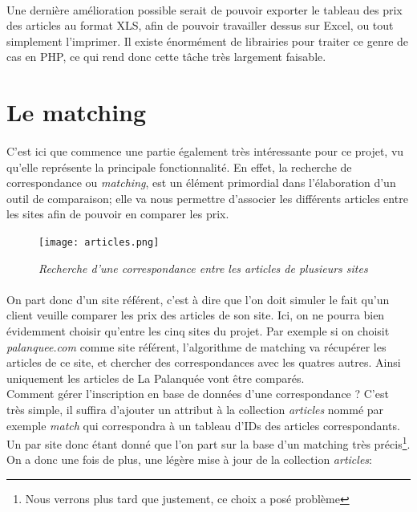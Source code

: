 \documentclass{report}
\begin{document}
\paragraph{}
Une dernière amélioration possible serait de pouvoir exporter le tableau des prix des articles au format XLS, afin de pouvoir travailler dessus sur Excel, ou tout simplement l'imprimer. Il existe énormément de librairies pour traiter ce genre de cas en PHP, ce qui rend donc cette tâche très largement faisable.

\section{Le matching}

\paragraph{}
C'est ici que commence une partie également très intéressante pour ce projet, vu qu'elle représente la principale fonctionnalité. En effet, la recherche de correspondance ou \textit{matching}, est un élément primordial dans l'élaboration d'un outil de comparaison; elle va nous permettre d'associer les différents articles entre les sites afin de pouvoir en comparer les prix.\\

\begin{figure}[H]
\begin{center}
\texttt{[image: articles.png]}
\caption{\textit{Recherche d'une correspondance entre les articles de plusieurs sites}}
\end{center}
\end{figure}

\paragraph{}
On part donc d'un site référent, c'est à dire que l'on doit simuler le fait qu'un client veuille comparer les prix des articles de son site. Ici, on ne pourra bien évidemment choisir qu'entre les cinq sites du projet. Par exemple si on choisit \textit{palanquee.com} comme site référent, l'algorithme de matching va récupérer les articles de ce site, et chercher des correspondances avec les quatres autres. Ainsi uniquement les articles de La Palanquée vont être comparés.\\
Comment gérer l'inscription en base de données d'une correspondance ? C'est très simple, il suffira d'ajouter un attribut à la collection \textit{articles} nommé par exemple \textit{match} qui correspondra à un tableau d'IDs des articles correspondants. Un par site donc étant donné que l'on part sur la base d'un matching très précis\footnote{Nous verrons plus tard que justement, ce choix a posé problème}.\\
On a donc une fois de plus, une légère mise à jour de la collection \textit{articles}: 
\end{document}
